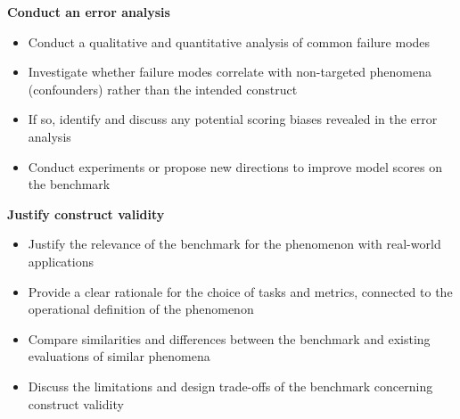 \textbf{Conduct an error analysis}
\begin{itemize}[leftmargin=25pt, label=\scriptsize$\square$]
    \item Conduct a qualitative and quantitative analysis of common failure modes
    \item Investigate whether failure modes correlate with non-targeted phenomena (confounders) rather than the intended construct
    \item If so, identify and discuss any potential scoring biases revealed in the error analysis
    \item Conduct experiments or propose new directions to improve model scores on the benchmark
\end{itemize}

\textbf{Justify construct validity}
\begin{itemize}[leftmargin=25pt, label=\scriptsize$\square$]
    \item Justify the relevance of the benchmark for the phenomenon with real-world applications
    \item Provide a clear rationale for the choice of tasks and metrics, connected to the operational definition of the phenomenon
    \item Compare similarities and differences between the benchmark and existing evaluations of similar phenomena
    \item Discuss the limitations and design trade-offs of the benchmark concerning construct validity
\end{itemize}
